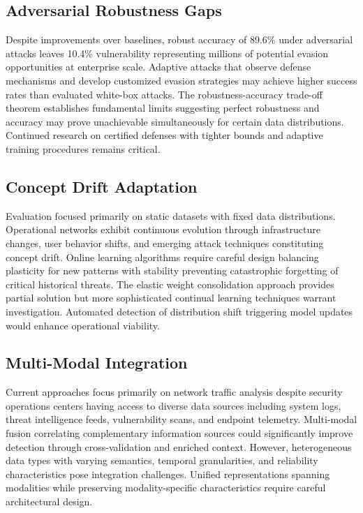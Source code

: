 \subsection*{Adversarial Robustness Gaps}

Despite improvements over baselines, robust accuracy of 89.6\% under adversarial attacks leaves 10.4\% vulnerability representing millions of potential evasion opportunities at enterprise scale. Adaptive attacks that observe defense mechanisms and develop customized evasion strategies may achieve higher success rates than evaluated white-box attacks. The robustness-accuracy trade-off theorem establishes fundamental limits suggesting perfect robustness and accuracy may prove unachievable simultaneously for certain data distributions. Continued research on certified defenses with tighter bounds and adaptive training procedures remains critical.

\subsection*{Concept Drift Adaptation}

Evaluation focused primarily on static datasets with fixed data distributions. Operational networks exhibit continuous evolution through infrastructure changes, user behavior shifts, and emerging attack techniques constituting concept drift. Online learning algorithms require careful design balancing plasticity for new patterns with stability preventing catastrophic forgetting of critical historical threats. The elastic weight consolidation approach provides partial solution but more sophisticated continual learning techniques warrant investigation. Automated detection of distribution shift triggering model updates would enhance operational viability.

\subsection*{Multi-Modal Integration}

Current approaches focus primarily on network traffic analysis despite security operations centers having access to diverse data sources including system logs, threat intelligence feeds, vulnerability scans, and endpoint telemetry. Multi-modal fusion correlating complementary information sources could significantly improve detection through cross-validation and enriched context. However, heterogeneous data types with varying semantics, temporal granularities, and reliability characteristics pose integration challenges. Unified representations spanning modalities while preserving modality-specific characteristics require careful architectural design.

